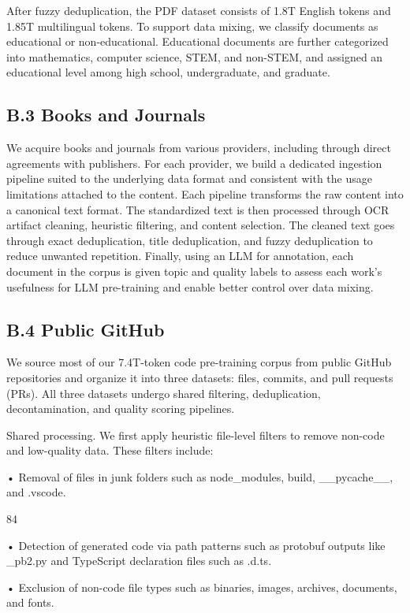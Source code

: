 \documentclass[
  10
]{article}
\begin{document}
After fuzzy deduplication, the PDF dataset consists of 1.8T English
tokens and 1.85T multilingual tokens. To support data mixing, we
classify documents as educational or non-educational. Educational
documents are further categorized into mathematics, computer science,
STEM, and non-STEM, and assigned an educational level among high school,
undergraduate, and graduate.

\subsection{B.3 Books and Journals}\label{b.3-books-and-journals}

We acquire books and journals from various providers, including through
direct agreements with publishers. For each provider, we build a
dedicated ingestion pipeline suited to the underlying data format and
consistent with the usage limitations attached to the content. Each
pipeline transforms the raw content into a canonical text format. The
standardized text is then processed through OCR artifact cleaning,
heuristic filtering, and content selection. The cleaned text goes
through exact deduplication, title deduplication, and fuzzy
deduplication to reduce unwanted repetition. Finally, using an LLM for
annotation, each document in the corpus is given topic and quality
labels to assess each work's usefulness for LLM pre-training and enable
better control over data mixing.

\subsection{B.4 Public GitHub}\label{b.4-public-github}

We source most of our 7.4T-token code pre-training corpus from public
GitHub repositories and organize it into three datasets: files, commits,
and pull requests (PRs). All three datasets undergo shared filtering,
deduplication, decontamination, and quality scoring pipelines.

Shared processing. We first apply heuristic file-level filters to remove
non-code and low-quality data. These filters include:

• Removal of files in junk folders such as node\_modules, build,
\_\_pycache\_\_, and .vscode.

84

• Detection of generated code via path patterns such as protobuf outputs
like \_pb2.py and TypeScript declaration files such as .d.ts.

• Exclusion of non-code file types such as binaries, images, archives,
documents, and fonts.
\end{document}
